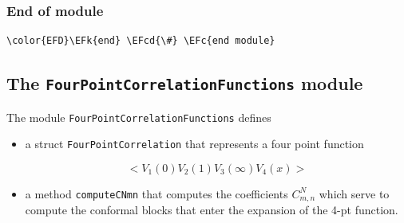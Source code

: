 \documentclass[a4paper]{article}
\numberwithin{equation}{section}
\newcommand{\EFc}[1]{\textcolor{EFc}{#1}} %
\newcommand{\EFcd}[1]{\textcolor{EFcd}{#1}} %
\newcommand{\EFk}[1]{\textcolor{EFk}{#1}} %
\begin{document}
\subsubsection*{End of module}
\label{sec:org8255063}

\begin{Code}
\begin{Verbatim}
\color{EFD}\EFk{end} \EFcd{\#} \EFc{end module}
\end{Verbatim}
\end{Code}
\subsection{The \texttt{FourPointCorrelationFunctions} module}
\label{sec:org5a04c64}
The module \texttt{FourPointCorrelationFunctions} defines

\begin{itemize}
\item a struct \texttt{FourPointCorrelation} that represents a four point function

\[
  < V_1(0) V_2(1) V_3(\infty) V_4(x)>
  \]

\item a method \texttt{computeCNmn} that computes the coefficients \(C^N_{m,n}\) which serve to compute the conformal blocks that enter the expansion of the 4-pt function.
\end{itemize}
\end{document}
